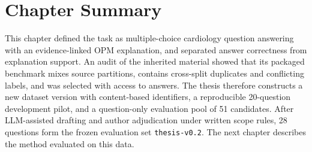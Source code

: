 \section{Chapter Summary}
\label{sec:ch3_summary}

This chapter defined the task as multiple-choice cardiology question answering with an evidence-linked OPM explanation, and separated answer correctness from explanation support. An audit of the inherited material showed that its packaged benchmark mixes source partitions, contains cross-split duplicates and conflicting labels, and was selected with access to answers. The thesis therefore constructs a new dataset version with content-based identifiers, a reproducible 20-question development pilot, and a question-only evaluation pool of 51 candidates. After LLM-assisted drafting and author adjudication under written scope rules, 28 questions form the frozen evaluation set \texttt{thesis-v0.2}. The next chapter describes the method evaluated on this data.
